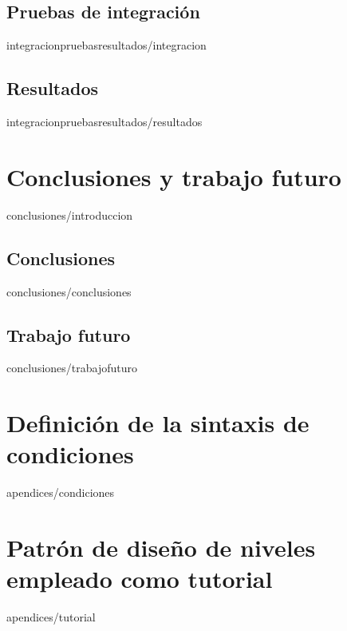 \documentclass[epsbased,lof,loc,copyright,final,extendedindex,firstnumbered,tfg,gnuplot]{tfgtfmthesisuam}
\begin{document}
	\section{Pruebas de integración\label{SEC:PRUEBASINTEGRACION}}{integracionpruebasresultados/integracion}
	\section{Resultados\label{SEC:RESULTADOS}}{integracionpruebasresultados/resultados}

\chapter{Conclusiones y trabajo futuro\label{CAP:CONCLUSIONES}}{conclusiones/introduccion}
	\section{Conclusiones\label{SEC:CONCLUSIONES}}{conclusiones/conclusiones}
	\section{Trabajo futuro\label{SEC:TRABAJOFUTURO}}{conclusiones/trabajofuturo}

\appendix

\chapter{Definición de la sintaxis de condiciones\label{CAP:APCONDICIONES}}{apendices/condiciones}
\chapter{Patrón de diseño de niveles empleado como tutorial\label{CAP:APTUTORIAL}}{apendices/tutorial}
\end{document}
